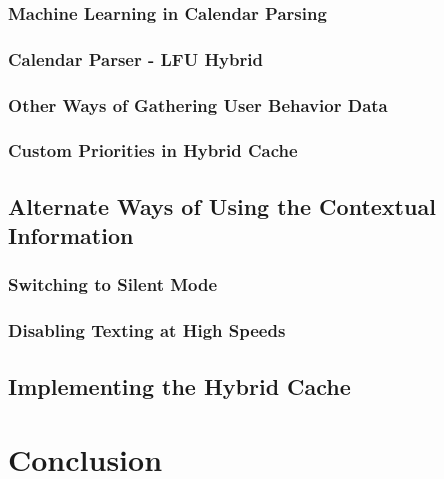 \documentclass[12pt]{uthesis-v12}  %
\begin{document}
		\subsection{Machine Learning in Calendar Parsing}
		
		\subsection{Calendar Parser - LFU Hybrid}
		
		\subsection{Other Ways of Gathering User Behavior Data}
		
		\subsection{Custom Priorities in Hybrid Cache}
			
	\section{Alternate Ways of Using the Contextual Information}
			
		\subsection{Switching to Silent Mode}
			
		\subsection{Disabling Texting at High Speeds}
		
	\section{Implementing the Hybrid Cache}

\chapter{Conclusion}		

\end{document}
